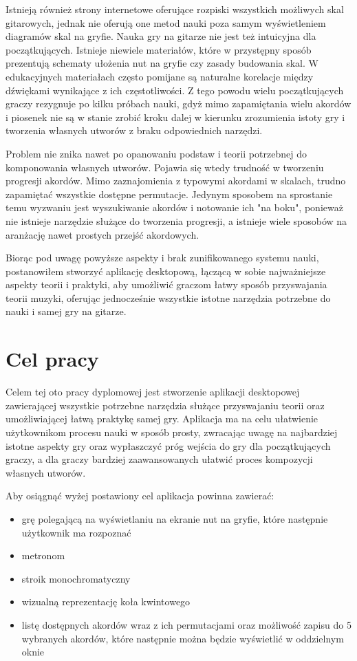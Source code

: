 Istnieją również strony internetowe oferujące rozpiski wszystkich możliwych skal gitarowych, jednak nie oferują one metod nauki poza samym wyświetleniem diagramów skal na gryfie. Nauka gry na gitarze nie jest też intuicyjna dla początkujących. Istnieje niewiele materiałów, które w przystępny sposób prezentują schematy ułożenia nut na gryfie czy zasady budowania skal. W edukacyjnych materiałach często pomijane są naturalne korelacje między dźwiękami wynikające z ich częstotliwości. Z tego powodu wielu początkujących graczy rezygnuje po kilku próbach nauki, gdyż mimo zapamiętania wielu akordów i piosenek nie są w stanie zrobić kroku dalej w kierunku zrozumienia istoty gry i tworzenia własnych utworów z braku odpowiednich narzędzi.

Problem nie znika nawet po opanowaniu podstaw i teorii potrzebnej do komponowania własnych utworów. Pojawia się wtedy trudność w tworzeniu progresji akordów. Mimo zaznajomienia z typowymi akordami w skalach, trudno zapamiętać wszystkie dostępne permutacje. Jedynym sposobem na sprostanie temu wyzwaniu jest wyszukiwanie akordów i notowanie ich "na boku", ponieważ nie istnieje narzędzie służące do tworzenia progresji, a istnieje wiele sposobów na aranżację nawet prostych przejść akordowych.

Biorąc pod uwagę powyższe aspekty i brak zunifikowanego systemu nauki, postanowiłem stworzyć aplikację desktopową, łączącą w sobie najważniejsze aspekty teorii i praktyki, aby umożliwić graczom łatwy sposób przyswajania teorii muzyki, oferując jednocześnie wszystkie istotne narzędzia potrzebne do nauki i samej gry na gitarze.

\section{Cel pracy}
Celem tej oto pracy dyplomowej jest stworzenie aplikacji desktopowej zawierającej wszystkie potrzebne narzędzia służące przyswajaniu teorii oraz umożliwiającej łatwą praktykę samej gry. Aplikacja ma na celu ułatwienie użytkownikom procesu nauki w sposób prosty, zwracając uwagę na najbardziej istotne aspekty gry oraz wypłaszczyć próg wejścia do gry dla początkujących graczy, a dla graczy bardziej zaawansowanych ułatwić proces kompozycji własnych utworów. 

Aby osiągnąć wyżej postawiony cel aplikacja powinna zawierać:
\begin{itemize}
    \item grę polegającą na wyświetlaniu na ekranie nut na gryfie, które następnie użytkownik ma rozpoznać
    \item metronom
    \item stroik monochromatyczny
    \item wizualną reprezentację koła kwintowego
    \item listę dostępnych akordów wraz z ich permutacjami oraz możliwość zapisu do 5 wybranych akordów, które następnie można będzie wyświetlić w oddzielnym oknie
\end{itemize}

